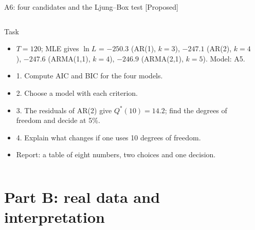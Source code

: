 \begin{frame}{A6: four candidates and the Ljung--Box test [Proposed]}
\propsub
\itemsize{\scriptsize}
\begin{columns}[T]
\begin{column}{\taskw}
\begin{block}{Task}
\begin{itemize}
    \item $T = 120$; MLE gives $\ln L$ = $-250.3$ (AR(1), $k = 3$), $-247.1$ (AR(2), $k = 4$), $-247.6$ (ARMA(1,1), $k = 4$), $-246.9$ (ARMA(2,1), $k = 5$). Model: A5.
    \item 1. Compute AIC and BIC for the four models.
    \item 2. Choose a model with each criterion.
    \item 3. The residuals of AR(2) give $Q^*(10) = 14.2$; find the degrees of freedom and decide at 5\%.
    \item 4. Explain what changes if one uses 10 degrees of freedom.
    \item Report: a table of eight numbers, two choices and one decision.
\end{itemize}
\end{block}
\end{column}
\begin{column}{\solw}
\end{column}
\end{columns}
\end{frame}


\section{Part B: real data and interpretation}

